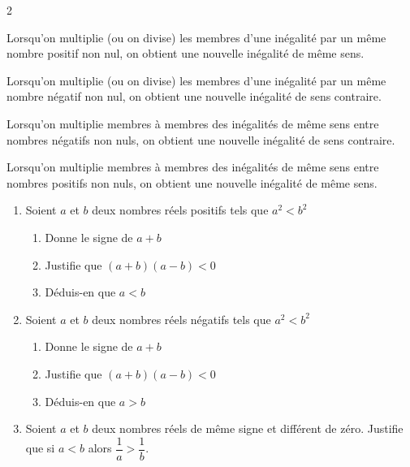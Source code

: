 \begin{multicols*}{2}
{  		  Lorsqu'on multiplie (ou on divise) les membres  d'une inégalité par un même nombre positif non nul, on obtient une nouvelle inégalité de même sens.
  
    Lorsqu'on multiplie (ou on divise) les membres  d'une inégalité par un même nombre négatif non nul, on obtient une nouvelle inégalité de sens contraire.
  		
  		 Lorsqu'on multiplie membres à membres des inégalités de même sens entre nombres négatifs non nuls, on obtient une nouvelle inégalité de sens contraire.  
  		
  		 Lorsqu'on multiplie membres à membres des inégalités de même sens entre nombres positifs non nuls, on obtient une nouvelle inégalité de même sens.  
  	}
  	\begin{enumerate}
  		\item Soient $a$ et $b$ deux nombres réels positifs tels que $a^2<b^2$
  		\begin{enumerate}
  			\item  Donne le signe de $a+b$
  			\item Justifie que $(a+b)(a-b)<0$
  			\item Déduis-en que $a<b$		
  		\end{enumerate}	
  		\item Soient $a$ et $b$ deux nombres réels négatifs tels que $a^2<b^2$
  		\begin{enumerate}
  			\item  Donne le signe de $a+b$
  			\item Justifie que $(a+b)(a-b)<0$
  			\item Déduis-en que $a>b$		
  		\end{enumerate}	
  		
  		\item Soient $a$ et $b$ deux nombres réels de même signe et différent de zéro. Justifie que si $a< b$ alors $\dfrac{1}{a}> \dfrac{1}{b}$.
  	\end{enumerate}
  	\dures
  	 
\end{multicols*}
